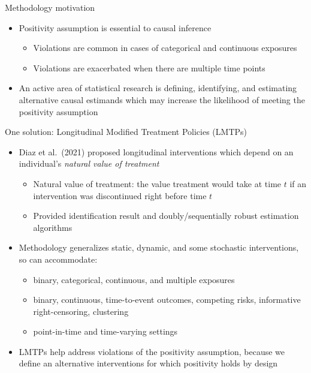 \documentclass[
  10pt,
  ignorenonframetext,
]{beamer}
\providecommand{\tightlist}{%
  \setlength{\itemsep}{0pt}\setlength{\parskip}{0pt}}\usepackage{longtable,booktabs,array}
\begin{document}
\begin{frame}{Methodology motivation}
\protect\hypertarget{methodology-motivation-1}{}
\begin{itemize}
\item
  Positivity assumption is essential to causal inference

  \begin{itemize}
  \item
    Violations are common in cases of categorical and continuous
    exposures
  \item
    Violations are exacerbated when there are multiple time points
  \end{itemize}
\item
  An active area of statistical research is defining, identifying, and
  estimating alternative causal estimands which may increase the
  likelihood of meeting the positivity assumption
\end{itemize}
\end{frame}

\begin{frame}{One solution: Longitudinal Modified Treatment Policies
(LMTPs)}
\protect\hypertarget{one-solution-longitudinal-modified-treatment-policies-lmtps}{}
\begin{itemize}
\item
  Diaz et al.~(2021) proposed longitudinal interventions which depend on
  an individual's \emph{natural value of treatment}

  \begin{itemize}
  \item
    Natural value of treatment: the value treatment would take at time
    \(t\) if an intervention was discontinued right before time \(t\)
  \item
    Provided identification result and doubly/sequentially robust
    estimation algorithms
  \end{itemize}
\item
  Methodology generalizes static, dynamic, and some stochastic
  interventions, so can accommodate:

  \begin{itemize}
  \tightlist
  \item
    binary, categorical, continuous, and multiple exposures
  \item
    binary, continuous, time-to-event outcomes, competing risks,
    informative right-censoring, clustering
  \item
    point-in-time and time-varying settings
  \end{itemize}
\item
  LMTPs help address violations of the positivity assumption, because we
  define an alternative interventions for which positivity holds by
  design
\end{itemize}
\end{frame}
\end{document}

